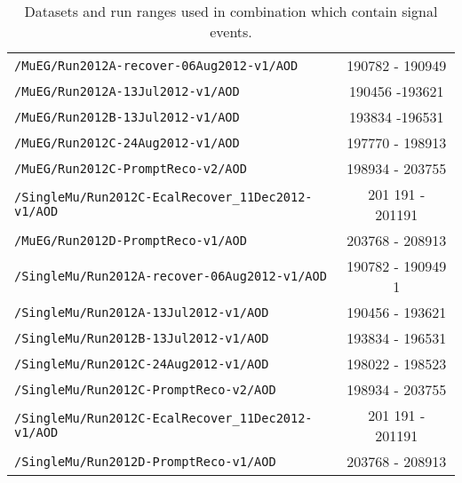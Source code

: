 \begin{table}[hbt]
\begin{center}
\begin{tabular}{lc}
\verb=/MuEG/Run2012A-recover-06Aug2012-v1/AOD=                          &      190782 - 190949                 \\ 
\verb=/MuEG/Run2012A-13Jul2012-v1/AOD=                                          &  190456 -193621                     \\ 
\verb=/MuEG/Run2012B-13Jul2012-v1/AOD=                                         &  193834 -196531       \\ 
\verb=/MuEG/Run2012C-24Aug2012-v1/AOD=                                      &   197770 - 198913                 \\ 
\verb=/MuEG/Run2012C-PromptReco-v2/AOD=                                     &   198934 - 203755                    \\ 
\verb=/SingleMu/Run2012C-EcalRecover_11Dec2012-v1/AOD=          & 201 191 - 201191 \\
\verb=/MuEG/Run2012D-PromptReco-v1/AOD=                                     &  203768 - 208913   \\

\verb=/SingleMu/Run2012A-recover-06Aug2012-v1/AOD=                    &   190782 - 190949          1          \\ 
\verb=/SingleMu/Run2012A-13Jul2012-v1/AOD=                                     &  190456 - 193621                      \\ 
\verb=/SingleMu/Run2012B-13Jul2012-v1/AOD=                                     &  193834 - 196531   \\ 
\verb=/SingleMu/Run2012C-24Aug2012-v1/AOD=                                   &   198022 - 198523                    \\ 
\verb=/SingleMu/Run2012C-PromptReco-v2/AOD=                                  &   198934 - 203755                    \\ 
\verb=/SingleMu/Run2012C-EcalRecover_11Dec2012-v1/AOD=          & 201 191 - 201191  \\
\verb=/SingleMu/Run2012D-PromptReco-v1/AOD=                                  &  203768 - 208913    \\



 \hline\hline
\end{tabular}
\caption{\label{tab:DilDsets_run}Datasets and run ranges used in combination which contain signal events.}
\end{center}
\end{table}



